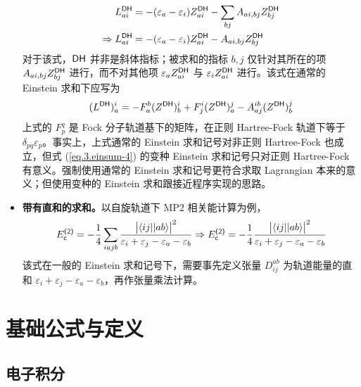 \begin{itemize}[nosep]
\begin{align}
    \label{eq.3.einsum-4}
    L_{ai}^{\textsf{DH}} &= - (\varepsilon_a - \varepsilon_i) Z_{ai}^{\textsf{DH}} - \sum_{bj} A_{ai, bj} Z_{bj}^{\textsf{DH}} \notag\\
    \Rightarrow
    L_{ai}^{\textsf{DH}} &= - (\varepsilon_a - \varepsilon_i) Z_{ai}^{\textsf{DH}} - A_{ai, bj} Z_{bj}^{\textsf{DH}}
\end{align}
对于该式，$\textsf{DH}$ 并非是斜体指标；被求和的指标 $b, j$ 仅针对其所在的项 $A_{ai, bj} Z_{bj}^{\textsf{DH}}$ 进行，而不对其他项 $\varepsilon_a Z_{ai}^{\textsf{DH}}$ 与 $\varepsilon_i Z_{ai}^{\textsf{DH}}$ 进行。该式在通常的 Einstein 求和下应写为
\begin{equation*}
    (L^{\textsf{DH}})_a^i = - F_a^b (Z^{\textsf{DH}})_b^i + F_j^i (Z^{\textsf{DH}})_a^j - A_{aj}^{ib} (Z^{\textsf{DH}})_b^j
\end{equation*}
上式的 $F_p^q$ 是 Fock 分子轨道基下的矩阵，在正则 Hartree-Fock 轨道下等于 $\delta_{pq} \varepsilon_p$。事实上，上式通常的 Einstein 求和记号对非正则 Hartree-Fock 也成立，但式 (\ref{eq.3.einsum-4}) 的变种 Einstein 求和记号只对正则 Hartree-Fock 有意义。强制使用通常的 Einstein 求和记号更符合求取 Lagrangian 本来的意义；但使用变种的 Einstein 求和跟接近程序实现的思路。
\item \textbf{带有直和的求和。}以自旋轨道下 MP2 相关能计算为例，
\begin{equation}
    E_{\textsf{c}}^{\textsf{(2)}} = - \frac{1}{4} \sum_{iajb} \frac{\big| \langle i j || a b \rangle \big|^2}{\varepsilon_i + \varepsilon_j - \varepsilon_a - \varepsilon_b}
    \Rightarrow
    E_{\textsf{c}}^{\textsf{(2)}} = - \frac{1}{4} \frac{\big| \langle i j || a b \rangle \big|^2}{\varepsilon_i + \varepsilon_j - \varepsilon_a - \varepsilon_b}
\end{equation}
该式在一般的 Einstein 求和记号下，需要事先定义张量 $D_{ij}^{ab}$ 为轨道能量的直和 $\varepsilon_i + \varepsilon_j - \varepsilon_a - \varepsilon_b$，再作张量乘法计算。
\end{itemize}

\section{基础公式与定义}
\label{sec.3.basic-equation-def}

\subsection{电子积分}

